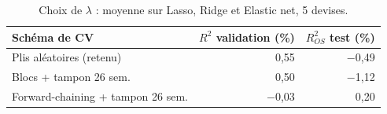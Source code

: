 \begin{table}[ht]
\centering
\small
\caption{Choix de $\lambda$ : moyenne sur Lasso, Ridge et Elastic net, 5 devises.}
\label{tab:cv}
\begin{tabular}{lrr}
\toprule
Schéma de CV & $R^2$ validation (\%) & $R^2_{OS}$ test (\%) \\
\midrule
Plis aléatoires (retenu) & 0,55 & $-$0,49 \\
Blocs + tampon 26 sem. & 0,50 & $-$1,12 \\
Forward-chaining + tampon 26 sem. & $-$0,03 & 0,20 \\
\bottomrule
\end{tabular}
\end{table}
